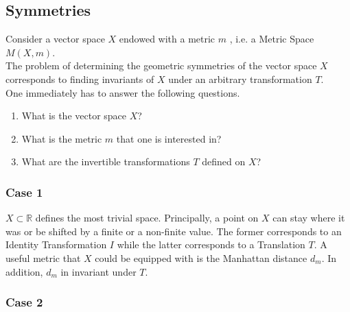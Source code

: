 \subsection{Symmetries}

Consider a vector space $X$ endowed with a metric $m$ , i.e. a Metric Space $M(X,m)$. \\
The problem of determining the geometric symmetries of the vector space $X$ corresponds to
finding invariants of $X$ under an arbitrary transformation $T$. \\

One immediately has to answer the following questions.
\begin{enumerate}
    \item What is the vector space $X$?
    \item What is the metric $m$ that one is interested in?
    \item What are the invertible transformations $T$ defined on $X$?
\end{enumerate}

\subsubsection{Case 1}
$X \subset \mathbb{R}$ defines the most trivial space. 
Principally, a point on $X$ can stay where it was or be shifted by a finite or a non-finite value.
The former corresponds to an Identity Transformation $I$ while the latter corresponds to a Translation $T$.
A useful metric that $X$ could be equipped with is the Manhattan distance $d_{m}$. In addition, $d_{m}$ in invariant under $T$.


\subsubsection{Case 2}

